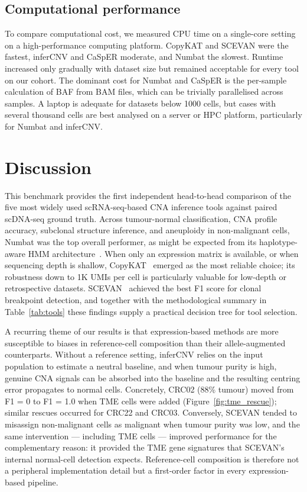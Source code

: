 \documentclass[11pt]{article}
\begin{document}
\subsection{Computational performance}

To compare computational cost, we measured CPU time on a single-core setting
on a high-performance computing platform. CopyKAT and SCEVAN were the
fastest, inferCNV and CaSpER moderate, and Numbat the slowest. Runtime
increased only gradually with dataset size but remained acceptable for every
tool on our cohort. The dominant cost for Numbat and CaSpER is the
per-sample calculation of BAF from BAM files, which can be trivially
parallelised across samples. A laptop is adequate for datasets below 1000
cells, but cases with several thousand cells are best analysed on a server
or HPC platform, particularly for Numbat and inferCNV.

\section{Discussion}

This benchmark provides the first independent head-to-head comparison of the
five most widely used scRNA-seq-based CNA inference tools against paired
scDNA-seq ground truth. Across tumour-normal classification, CNA profile
accuracy, subclonal structure inference, and aneuploidy in non-malignant
cells, Numbat was the top overall performer, as might be expected from its
haplotype-aware HMM architecture~\cite{gao2023numbat}. When only an
expression matrix is available, or when sequencing depth is shallow,
CopyKAT~\cite{gao2021copykat} emerged as the most reliable choice; its
robustness down to 1K UMIs per cell is particularly valuable for low-depth
or retrospective datasets. SCEVAN~\cite{defalco2023scevan} achieved the best
F1 score for clonal breakpoint detection, and together with the
methodological summary in Table~\ref{tab:tools} these findings supply a
practical decision tree for tool selection.

A recurring theme of our results is that expression-based methods are more
susceptible to biases in reference-cell composition than their
allele-augmented counterparts. Without a reference setting, inferCNV relies
on the input population to estimate a neutral baseline, and when tumour
purity is high, genuine CNA signals can be absorbed into the baseline and
the resulting centring error propagates to normal cells. Concretely, CRC02
(88\% tumour) moved from F1 = 0 to F1 = 1.0 when TME cells were added
(Figure~\ref{fig:tme_rescue}); similar rescues occurred for CRC22 and CRC03.
Conversely, SCEVAN tended to misassign non-malignant cells as malignant when
tumour purity was low, and the same intervention --- including TME cells
--- improved performance for the complementary reason: it provided the TME
gene signatures that SCEVAN's internal normal-cell detection expects.
Reference-cell composition is therefore not a peripheral implementation
detail but a first-order factor in every expression-based pipeline.
\end{document}
